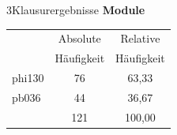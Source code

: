 \documentclass[xcolor=table,9pt,aspectratio=169]{beamer}
\begin{document}
\begin{frame}{\vspace*{10mm}3\hspace*{1em}Klausurergebnisse}
\textbf{Module}\\

\medskip
\begin{tabular}{lcc}
   \arrayrulecolor{blue2}\hline
            & Absolute     & Relative     \\
            & Häufigkeit   & Häufigkeit   \\
   \hline\hline
   phi130   &  76          &  63,33       \\
   pb036    &  44          &  36,67       \\
   \hline
            & 121          & 100,00       \\
   \hline
\end{tabular}
\end{frame}
\end{document}
